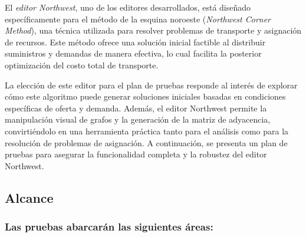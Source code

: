 \documentclass[stu, 12pt, letterpaper, donotrepeattitle, floatsintext, natbib]{apa7}
\begin{document}
\noindent El \textit{editor Northwest}, uno de los editores desarrollados, está diseñado específicamente para el método de la esquina noroeste (\textit{Northwest Corner Method}), una técnica utilizada para resolver problemas de transporte y asignación de recursos. Este método ofrece una solución inicial factible al distribuir suministros y demandas de manera efectiva, lo cual facilita la posterior optimización del costo total de transporte.

\noindent La elección de este editor para el plan de pruebas responde al interés de explorar cómo este algoritmo puede generar soluciones iniciales basadas en condiciones específicas de oferta y demanda. Además, el editor Northwest permite la manipulación visual de grafos y la generación de la matriz de adyacencia, convirtiéndolo en una herramienta práctica tanto para el análisis como para la resolución de problemas de asignación. A continuación, se presenta un plan de pruebas para asegurar la funcionalidad completa y la robustez del editor Northwest.

\subsection{Alcance}

\subsubsection{Las pruebas abarcarán las siguientes áreas:}
\end{document}
